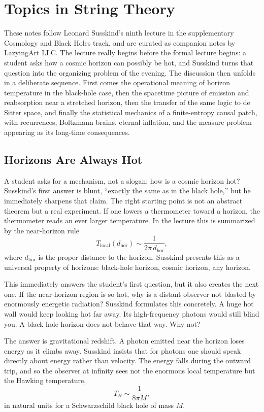 \chapter{Topics in String Theory}

These notes follow Leonard Susskind's ninth lecture in the supplementary Cosmology and Black Holes track, and are curated as companion notes by LazyingArt LLC. The lecture really begins before the formal lecture begins: a student asks how a cosmic horizon can possibly be hot, and Susskind turns that question into the organizing problem of the evening. The discussion then unfolds in a deliberate sequence. First comes the operational meaning of horizon temperature in the black-hole case, then the spacetime picture of emission and reabsorption near a stretched horizon, then the transfer of the same logic to de Sitter space, and finally the statistical mechanics of a finite-entropy causal patch, with recurrences, Boltzmann brains, eternal inflation, and the measure problem appearing as its long-time consequences.

\section{Horizons Are Always Hot}

A student asks for a mechanism, not a slogan: how is a cosmic horizon hot? Susskind's first answer is blunt, ``exactly the same as in the black hole,'' but he immediately sharpens that claim. The right starting point is not an abstract theorem but a real experiment. If one lowers a thermometer toward a horizon, the thermometer reads an ever larger temperature. In the lecture this is summarized by the near-horizon rule
\begin{equation}
T_{\text{local}}(d_{\text{hor}})\sim \frac{1}{2\pi\, d_{\text{hor}}},
\end{equation}
where \(d_{\text{hor}}\) is the proper distance to the horizon. Susskind presents this as a universal property of horizons: black-hole horizon, cosmic horizon, any horizon.

This immediately answers the student's first question, but it also creates the next one. If the near-horizon region is so hot, why is a distant observer not blasted by enormously energetic radiation? Susskind formulates this concretely. A huge hot wall would keep looking hot far away. Its high-frequency photons would still blind you. A black-hole horizon does not behave that way. Why not?

The answer is gravitational redshift. A photon emitted near the horizon loses energy as it climbs away. Susskind insists that for photons one should speak directly about energy rather than velocity. The energy falls during the outward trip, and so the observer at infinity sees not the enormous local temperature but the Hawking temperature,
\begin{equation}
T_H\sim \frac{1}{8\pi M},
\end{equation}
in natural units for a Schwarzschild black hole of mass \(M\).

